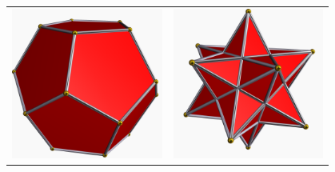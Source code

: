 \documentclass{minimal}
\begin{document}
\scshape\fontsize{18pt}{18pt}\selectfont
\centering
\begin{tabular}{%
	>{\centering\let\newline\\\arraybackslash\hspace{0pt}}p{0.4\linewidth}
	>{\centering\let\newline\\\arraybackslash\hspace{0pt}}p{0.4\linewidth}
}
\includegraphics[scale=0.25]{Dodecahedron.png} &
\includegraphics[scale=0.25]{Small_stellated_dodecahedron.png} \\

\end{tabular}
\end{document}
